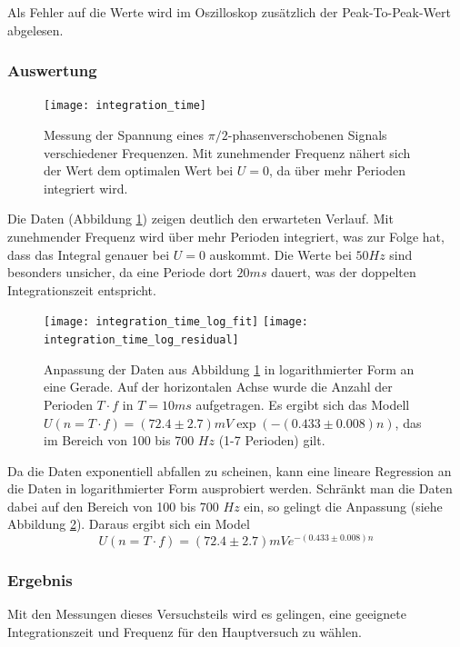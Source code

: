 \documentclass{../Misc/MontavonLaTeX/Montavon}
\begin{document}
Als Fehler auf die Werte wird im Oszilloskop zusätzlich der Peak-To-Peak-Wert abgelesen.

\subsubsection{Auswertung}

\begin{figure}[htbp]
\centering
\texttt{[image: integration\_time]}
\caption{Messung der Spannung eines $\pi / 2$-phasenverschobenen Signals verschiedener Frequenzen. Mit zunehmender Frequenz nähert sich der Wert dem optimalen Wert bei $U = 0$, da über mehr Perioden integriert wird.}
\label{fig:integration_time}
\end{figure}

Die Daten (Abbildung \ref{fig:integration_time}) zeigen deutlich den erwarteten Verlauf. Mit zunehmender Frequenz wird über mehr Perioden integriert, was zur Folge hat, dass das Integral genauer bei $U = 0$ auskommt. Die Werte bei $50 \unit{Hz}$ sind besonders unsicher, da eine Periode dort $20 \unit{ms}$ dauert, was der doppelten Integrationszeit entspricht. 

\begin{figure}[htbp]
\centering
\texttt{[image: integration\_time\_log\_fit]}
\texttt{[image: integration\_time\_log\_residual]}
\caption{Anpassung der Daten aus Abbildung \ref{fig:integration_time} in logarithmierter Form an eine Gerade. Auf der horizontalen Achse wurde die Anzahl der Perioden $T \cdot f$ in $T = 10 \unit{ms}$ aufgetragen. Es ergibt sich das Modell $U(n = T\cdot f) = (72.4 \pm 2.7) \unit{mV} \exp\left(-(0.433 \pm 0.008) n\right)$, das im Bereich von 100 bis 700 $\unit{Hz}$ (1-7 Perioden) gilt.}
\label{fig:integration_time_fit}
\end{figure}

Da die Daten exponentiell abfallen zu scheinen, kann eine lineare Regression an die Daten in logarithmierter Form ausprobiert werden. Schränkt man die Daten dabei auf den Bereich von 100 bis 700 $\unit{Hz}$ ein, so gelingt die Anpassung (siehe Abbildung \ref{fig:integration_time_fit}). Daraus ergibt sich ein Model
\[
U(n=T \cdot f) = (72.4 \pm 2.7) \unit{mV} e^{-(0.433 \pm 0.008) n}
\]

\subsubsection{Ergebnis}
Mit den Messungen dieses Versuchsteils wird es gelingen, eine geeignete Integrationszeit und Frequenz für den Hauptversuch zu wählen.
\end{document}
